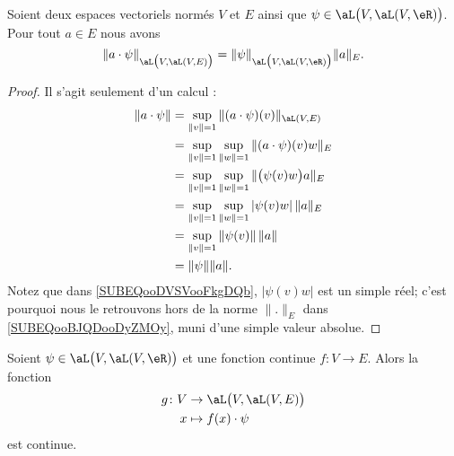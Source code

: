 \begin{lemma}        \label{LEMooHCUSooXYHuBR}
	Soient deux espaces vectoriels normés \( V\) et \( E\) ainsi que \( \psi\in\aL\big( V,\aL(V,\eR) \big)\). Pour tout \( a\in E\) nous avons
	\begin{equation}
		\| a\cdot \psi \|_{\aL\big( V,\aL(V,E) \big)}= \| \psi \|_{\aL\big( V,\aL(V,\eR) \big)}\| a \|_E.
	\end{equation}
\end{lemma}

\begin{proof}
	Il s'agit seulement d'un calcul :
	\begin{subequations}
		\begin{align}
			\| a\cdot \psi \| & =\sup_{\| v \|=1}\| (a\cdot \psi)(v) \|_{\aL(V,E)}                                          \\
			                  & =\sup_{\| v \|=1}\sup_{\| w \|=1}\| (a\cdot\psi)(v)w \|_E                                   \\
			                  & =\sup_{\| v \|=1}\sup_{\| w \|=1}\| \big( \psi(v)w \big)a \|_E  \label{SUBEQooDVSVooFkgDQb} \\
			                  & =\sup_{\| v \|=1}\sup_{\| w \|=1}| \psi(v)w |\,\| a \|_{E} \label{SUBEQooBJQDooDyZMOy}      \\
			                  & =\sup_{\| v \|=1}\| \psi(v) \|\,\| a \|                                                     \\
			                  & =\| \psi \|\| a \|.
		\end{align}
	\end{subequations}
	Notez que dans \eqref{SUBEQooDVSVooFkgDQb}, \( | \psi(v)w |\) est un simple réel; c'est pourquoi nous le retrouvons hors de la norme \( \| . \|_E\) dans \eqref{SUBEQooBJQDooDyZMOy}, muni d'une simple valeur absolue.
\end{proof}

\begin{lemma}
	Soient \( \psi\in\aL\big( V,\aL(V,\eR) \big)\) et une fonction continue \( f\colon V\to E\). Alors la fonction
	\begin{equation}
		\begin{aligned}
			g\colon V & \to \aL\big( V,\aL(V,E) \big) \\
			x         & \mapsto f(x)\cdot \psi
		\end{aligned}
	\end{equation}
	est continue.
\end{lemma}

